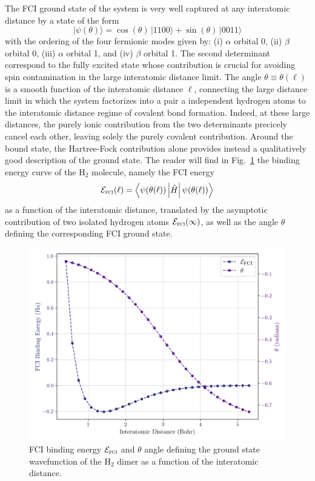 \documentclass[aps,prl,twocolumn,groupedaddress, reprint,floatfix,nofootinbib,longbibliography]{revtex4-2}
\begin{document}
        The FCI ground state of the system is very well captured at any interatomic distance by a state of the form
        \begin{equation}
            |\psi(\theta)\rangle = \cos(\theta)\,|1100\rangle + \sin(\theta)\,|0011\rangle
        \end{equation}
        with the ordering of the four fermionic modes given by: (i) $\alpha$ orbital 0, (ii) $\beta$ orbital 0, (iii) $\alpha$ orbital 1, and (iv) $\beta$ orbital 1. The second determinant correspond to the fully excited state whose contribution is crucial for avoiding spin contamination in the large interatomic distance limit. The angle $\theta\equiv\theta(\ell)$ is a smooth function of the interatomic distance $\ell$, connecting the large distance limit in which the system factorizes into a pair a independent hydrogen atoms to the interatomic distance regime of covalent bond formation. Indeed, at these large distances, the purely ionic contribution from the two determinants precicely cancel each other, leaving solely the purely covalent contribution. Around the bound state, the Hartree-Fock contribution alone provides instead a qualitatively good description of the ground state. The reader will find in Fig.~\ref{fig:binding_theta} the binding energy curve of the H$_2$ molecule, namely the FCI energy
        \begin{equation}
            \mathcal E_\textsc{fci}(\ell) = \left\langle\psi(\theta(\ell))\left|\hat{H}\right|\psi(\theta(\ell))\right\rangle
        \end{equation}
        as a function of the interatomic distance, translated by the asymptotic contribution of two isolated hydrogen atoms $\mathcal E_\textsc{fci}(\infty)$, as well as the angle $\theta$ defining the corresponding FCI ground state.

        \begin{figure}[ht]
            \centering
                \includegraphics[width=0.5
                \textwidth]{figures/binding_theta.png}
                \caption{FCI binding energy $\mathcal E_\textsc{fci}$ and $\theta$ angle defining the ground state wavefunction of the H$_2$ dimer as a function of the interatomic distance.}
        \label{fig:binding_theta}
        \end{figure}
\end{document}
